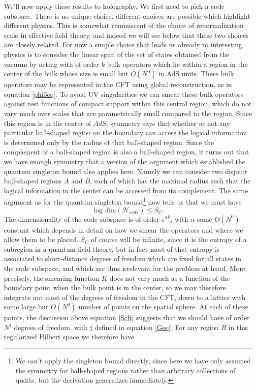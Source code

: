 \documentclass[toc]{PoS}
\newcommand{\be}{\begin{equation}}
\newcommand{\ee}{\end{equation}}
\newcommand{\Hc}{\mathcal{H}_{code}}
\begin{document}
We'll now apply these results to holography.  We first need to pick a code subspace.  There is no unique choice, different choices are possible which highlight different physics.  This is somewhat reminiscent of the choice of renormalization scale in effective field theory, and indeed we will see below that these two choices are closely related.  For now a simple choice that leads us already to interesting physics is to consider the linear span of the set of states obtained from the vacuum by acting with of order $k$ bulk operators which lie within a region in the center of the bulk whose size is small but $O(N^0)$ in AdS units.  These bulk operators may be represented in the CFT using global reconstruction, as in equation \eqref{phi3eq}.  To avoid UV singularities we can smear these bulk operators against test functions of compact support within this central region, which do not vary much over scales that are parametrically small compared to the region.  Since this region is in the center of $AdS$, symmetry says that whether or not any particular ball-shaped region on the boundary can access the logical information is determined only by the radius of that ball-shaped region.  Since the complement of a ball-shaped region is also a ball-shaped region, it turns out that we have enough symmetry that a version of the argument which established the quantum singleton bound also applies here.  Namely we can consider two disjoint ball-shaped regions $A$ and $B$, each of which has the maximal radius such that the logical information in the center can be accessed from its complement.  The same argument as for the quantum singleton bound\footnote{We can't apply the singleton bound directly, since here we have only assumed the symmetry for ball-shaped regions rather than arbitrary collections of qudits, but the derivation generalizes immediately.} now tells us that we must have
\be\label{cftsing}
\log \mathrm{dim}(\Hc)\leq S_C.
\ee
The dimensionality of the code subspace is of order $e^{\alpha k}$, with $\alpha$ some $O(N^0)$ constant which depends in detail on how we smear the operators and where we allow them to be placed.  $S_C$ of course will be infinite, since it is the entropy of a subregion in a quantum field theory, but in fact most of that entropy is associated to short-distance degrees of freedom which are fixed for all states in the code subspace, and which are thus irrelevant for the problem at hand.  More precisely, the smearing function $K$ does not vary much as a function of the boundary point when the bulk point is in the center, so we may therefore integrate out most of the degrees of freedom in the CFT, down to a lattice with some large but $O(N^0)$ number of points on the spatial sphere.  At each of these points, the discussion above equation \eqref{Scft} suggests that we should have of order $N^{\sharp}$ degrees of freedom, with $\sharp$ defined in equation \eqref{Geq}.  For any region $R$ in this regularized Hilbert space we therefore have
\end{document}
